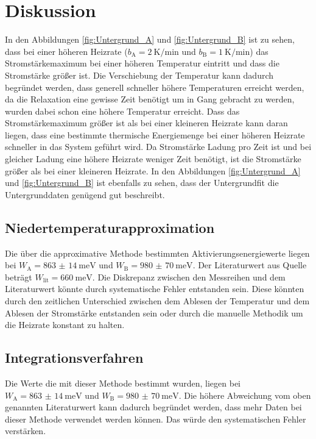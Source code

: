 \section{Diskussion}
\label{sec:Diskussion}
In den Abbildungen \ref{fig:Untergrund_A} und \ref{fig:Untergrund_B} ist zu sehen, dass bei einer höheren Heizrate ($b_{\text{A}}=
\SI{2}{\kelvin\per\minute}$ und $b_{\text{B}}=\SI{1}{\kelvin\per\minute}$) das Stromstärkemaximum bei einer höheren Temperatur 
eintritt und dass die Stromstärke größer ist. Die Verschiebung der Temperatur kann dadurch begründet werden, dass generell schneller höhere
Temperaturen erreicht werden, da die Relaxation eine gewisse Zeit benötigt um in Gang gebracht zu werden, wurden dabei schon eine höhere Temperatur erreicht.
Dass das Stromstärkemaximum
größer ist als bei einer kleineren Heizrate kann daran liegen, dass eine bestimmte thermische Energiemenge bei einer höheren Heizrate schneller 
in das System geführt wird. Da Stromstärke Ladung pro Zeit ist und bei gleicher Ladung eine höhere Heizrate weniger Zeit benötigt, ist die Stromstärke 
größer als bei einer kleineren Heizrate. In den Abbildungen \ref{fig:Untergrund_A} und \ref{fig:Untergrund_B} ist ebenfalls zu sehen,
dass der Untergrundfit die Untergrunddaten genügend gut beschreibt.

\subsection{Niedertemperaturapproximation}
Die über die approximative Methode bestimmten Aktivierungsenergiewerte liegen bei $W_{\text{A}}=\SI{863(14)}{\milli\eV}$ und
$W_{\text{B}}=\SI{980(70)}{\milli\eV}$. Der Literaturwert aus Quelle \cite{Muccillo} beträgt $W_{\text{lit}}=\SI{660}{\milli\eV}$.
Die Diskrepanz zwischen den Messreihen und dem Literaturwert könnte durch systematische Fehler entstanden sein. Diese könnten 
durch den zeitlichen Unterschied zwischen dem Ablesen der Temperatur und dem Ablesen der Stromstärke entstanden sein oder 
durch die manuelle Methodik um die Heizrate konstant zu halten. 

\subsection{Integrationsverfahren}
Die Werte die mit dieser Methode bestimmt wurden, liegen bei $W_{\text{A}}=\SI{863(14)}{\milli\eV}$ und $W_{\text{B}}=\SI{980(70)}{\milli\eV}$.
Die höhere Abweichung vom oben genannten Literaturwert kann dadurch begründet werden, dass mehr Daten bei dieser Methode verwendet werden können.
Das würde den systematischen Fehler verstärken. 


